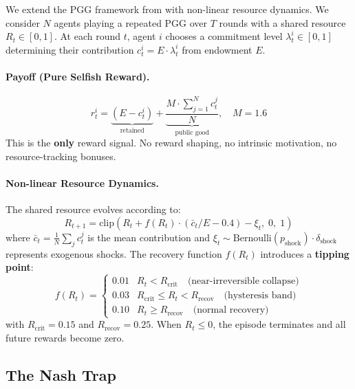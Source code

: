 \documentclass{article}
\begin{document}
We extend the PGG framework from \cite{anonymous2026beyond} with non-linear resource dynamics.
We consider $N$ agents playing a repeated PGG over $T$ rounds with a shared resource $R_t \in [0, 1]$.
At each round $t$, agent $i$ chooses a commitment level $\lambda_t^i \in [0, 1]$ determining their contribution $c_t^i = E \cdot \lambda_t^i$ from endowment $E$.

\paragraph{Payoff (Pure Selfish Reward).}
\begin{equation}
    r_t^i = \underbrace{(E - c_t^i)}_{\text{retained}} + \underbrace{\frac{M \cdot \sum_{j=1}^N c_t^j}{N}}_{\text{public good}}, \quad M = 1.6
    \label{eq:reward}
\end{equation}
This is the \textbf{only} reward signal.
No reward shaping, no intrinsic motivation, no resource-tracking bonuses.

\paragraph{Non-linear Resource Dynamics.}
The shared resource evolves according to:
\begin{equation}
    R_{t+1} = \text{clip}\!\left(R_t + f(R_t) \cdot \left(\bar{c}_t / E - 0.4\right) - \xi_t,\; 0,\; 1\right)
    \label{eq:resource}
\end{equation}
where $\bar{c}_t = \frac{1}{N}\sum_j c_t^j$ is the mean contribution and $\xi_t \sim \text{Bernoulli}(p_{\text{shock}}) \cdot \delta_{\text{shock}}$ represents exogenous shocks.
The recovery function $f(R_t)$ introduces a \textbf{tipping point}:
\begin{equation}
    f(R_t) = \begin{cases}
        0.01 & R_t < R_{\text{crit}} \quad \text{(near-irreversible collapse)} \\
        0.03 & R_{\text{crit}} \leq R_t < R_{\text{recov}} \quad \text{(hysteresis band)} \\
        0.10 & R_t \geq R_{\text{recov}} \quad \text{(normal recovery)}
    \end{cases}
    \label{eq:tipping}
\end{equation}
with $R_{\text{crit}} = 0.15$ and $R_{\text{recov}} = 0.25$.
When $R_t \leq 0$, the episode terminates and all future rewards become zero.

\subsection{The Nash Trap}
\end{document}
